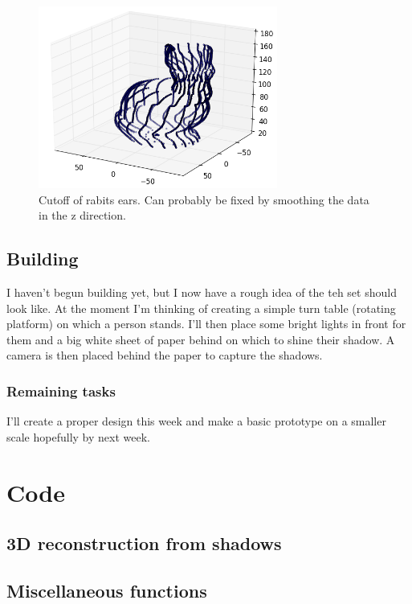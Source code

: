 \documentclass[a4paper]{article}
\begin{document}
\begin{figure}[H]
  \centering
    \includegraphics[width=0.7\textwidth]{figures/ear_and_back_cutoff.png}
    \caption{Cutoff of rabits ears. Can probably be fixed by smoothing the data in the z direction.}
  \label{fig:f2}
\end{figure}

\subsection{Building}
I haven't begun building yet, but I now have a rough idea of the teh set should look like. 
At the moment I'm thinking of creating a simple turn table (rotating platform) on which a person stands. I'll then place some bright lights in front for them and a big white sheet of paper behind on which to shine their shadow. 
A camera is then placed behind the paper to capture the shadows.

\subsubsection{Remaining tasks}
I'll create a proper design this week and make a basic prototype on a smaller scale hopefully by next week.

\newpage
\section{Code}
\subsection{3D reconstruction from shadows}
\label{alg:shadow}

\subsection{Miscellaneous functions}
\label{alg:misc}

\end{document}
